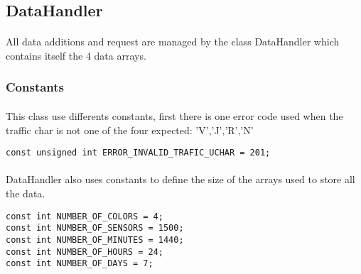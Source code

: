\documentclass[a4paper, 12pts]{article}
\begin{document}
\subsection{DataHandler}
\paragraph{}
All data additions and request are managed by the class DataHandler which contains itself the 4 data arrays.

\subsubsection{Constants}

\paragraph{}
	This class use differents constants, first there is one error code used when the traffic char is not one of the four expected: 'V','J','R','N'

\begin{lstlisting}
const unsigned int ERROR_INVALID_TRAFIC_UCHAR = 201;
\end{lstlisting}

\paragraph{}
	DataHandler also uses constants to define the size of the arrays used to store all the data.

\begin{lstlisting}
const int NUMBER_OF_COLORS = 4;
const int NUMBER_OF_SENSORS = 1500;
const int NUMBER_OF_MINUTES = 1440;
const int NUMBER_OF_HOURS = 24;
const int NUMBER_OF_DAYS = 7;
\end{lstlisting}

\end{document}
